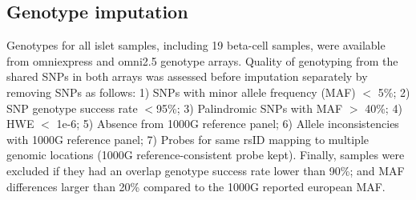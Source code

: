 \subsection{Genotype imputation}
Genotypes for all islet samples, including 19 beta-cell samples, were available from omniexpress and omni2.5 genotype arrays. Quality of genotyping from the shared SNPs in both arrays was assessed before imputation separately by removing SNPs as follows: 1) SNPs with minor allele frequency (MAF) $<$ 5\%; 2) SNP genotype success rate $<$95\%; 3) Palindromic SNPs with MAF $>$ 40\%; 4) HWE $<$ 1e-6; 5) Absence from 1000G reference panel; 6) Allele inconsistencies with 1000G reference panel; 7) Probes for same rsID mapping to multiple genomic locations (1000G reference-consistent probe kept). Finally, samples were excluded if they had an overlap genotype success rate lower than 90\%; and MAF differences larger than 20\% compared to the 1000G reported european MAF. \\
    
